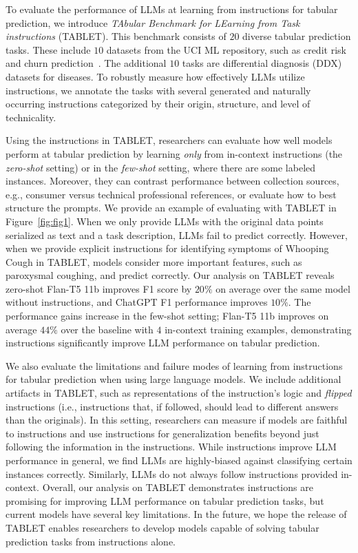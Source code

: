 To evaluate the performance of LLMs at learning from instructions for tabular prediction, we introduce \textit{TAbular Benchmark for LEarning from Task instructions} (TABLET). This benchmark consists of $20$ diverse tabular prediction tasks. These include $10$ datasets from the UCI ML repository, such as credit risk and churn prediction~\cite{Dua:2019}. The additional $10$ tasks are differential diagnosis (DDX) datasets for diseases. To robustly measure how effectively LLMs utilize instructions, we annotate the tasks with several generated and naturally occurring instructions categorized by their origin, structure, and level of technicality.

Using the instructions in TABLET, researchers can evaluate how well models perform at tabular prediction by learning \textit{only} from in-context instructions (the \textit{zero-shot} setting) or in the \textit{few-shot} setting, where there are some labeled instances. Moreover, they can contrast performance between collection sources, e.g., consumer versus technical professional references, or evaluate how to best structure the prompts. We provide an example of evaluating with TABLET in Figure~\ref{fig:fig1}.
When we only provide LLMs with the original data points serialized as text and a task description, LLMs fail to predict correctly. However, when we provide explicit instructions for identifying symptoms of Whooping Cough in TABLET, models consider more important features, such as paroxysmal coughing, and predict correctly. Our analysis on TABLET reveals zero-shot Flan-T5 11b improves F1 score by $20\%$ on average over the same model without instructions, and ChatGPT F1 performance improves $10\%$.
The performance gains increase in the few-shot setting; Flan-T5 11b improves on average $44\%$ over the baseline with $4$ in-context training examples, demonstrating instructions significantly improve LLM performance on tabular prediction.

We also evaluate the limitations and failure modes of learning from instructions for tabular prediction when using large language models. We include additional artifacts in TABLET, such as representations of the instruction's logic and \textit{flipped} instructions (i.e., instructions that, if followed, should lead to different answers than the originals). In this setting, researchers can measure if models are faithful to instructions and use instructions for  generalization benefits beyond just following the information in the instructions. While instructions improve LLM performance in general, we find LLMs are highly-biased against classifying certain instances correctly. Similarly, LLMs do not always follow instructions provided in-context. Overall, our analysis on TABLET demonstrates instructions are promising for improving LLM performance on tabular prediction tasks, but current models have several key limitations. In the future, we hope the release of TABLET enables researchers to develop models capable of solving tabular prediction tasks from instructions alone.

